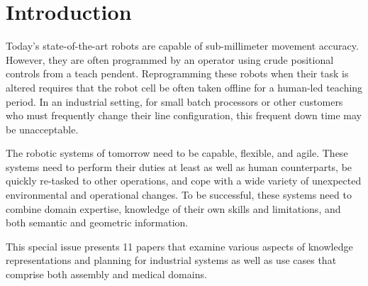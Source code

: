 \section{Introduction}
Today's state-of-the-art robots are capable of sub-millimeter movement accuracy. 
However, they are often programmed by an operator using crude positional controls 
from a teach pendent. Reprogramming these robots when their task is altered requires 
that the robot cell be often taken offline for a human-led teaching period. In an 
industrial setting, for small batch processors or other customers who must 
frequently change their line configuration, this frequent down time may be unacceptable. 

The robotic systems of tomorrow need to be capable, flexible, and agile. These 
systems need to perform their duties at least as well as human counterparts, be 
quickly re-tasked to other operations, and cope with a wide variety of unexpected 
environmental and operational changes. To be successful, these systems need to combine 
domain expertise, knowledge of their own skills and limitations, and both semantic and 
geometric information.

This special issue presents 11 papers that examine various aspects of knowledge 
representations and planning for industrial systems as well as use cases that comprise 
both assembly and medical domains.
